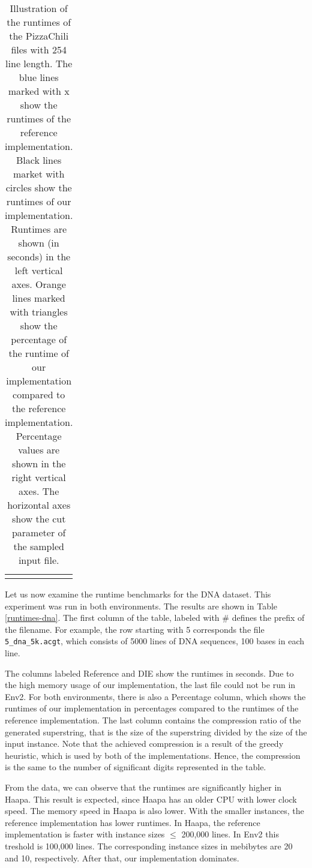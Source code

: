 \documentclass[english,twoside,censored,csm,algorithms-track-2020]{HYthesisML}
\theoremstyle{plain}
\theoremstyle{definition}
\numberwithin{testexample}{chapter}
\begin{document}
\begin{table}[]
{\begin{tabular}{c@{\hskip 0.5in}c}
\hspace{0.6cm}
\begin{minipage}{.5\textwidth}
  \caption{Illustration of the runtimes of the PizzaChili files with 254 line length. The blue lines
    marked with x show the runtimes of the reference implementation. Black lines market with circles
    show the runtimes of our implementation. Runtimes are shown (in seconds) in the left vertical
    axes. Orange lines marked with triangles show the percentage of the runtime of our implementation
    compared to the reference implementation. Percentage values are shown in the right vertical axes.
    The horizontal axes show the cut parameter of the sampled input file.}
  \label{tbl-graphs}    
\end{minipage}

  \end{tabular}%
}
\end{table}



\vspace{-2.5cm}
Let us now examine the runtime benchmarks for the DNA dataset. This experiment was run in both
environments. The results are shown in Table \ref{runtimes-dna}. The first column of the table,
labeled with \# defines the prefix of the filename. For example, the row starting with 5 corresponds the
file \texttt{5\_dna\_5k.acgt}, which consists of 5000 lines of DNA sequences, 100 bases in each
line.
  
The columns labeled Reference and DIE show the runtimes in seconds.
Due to the high memory usage of our implementation, the last file could not be run in Env2.
For both environments, there is
also a Percentage column, which shows the runtimes of our implementation in percentages compared
to the runtimes of the reference implementation. The last column contains the compression ratio of the
generated superstring, that is the size of the superstring divided by the size of the input instance.
Note that the achieved compression is a result of the greedy heuristic, which is used by both
of the implementations. Hence, the compression is the same to the number of significant digits
represented in the table.

From the data, we can observe that the runtimes are significantly higher in Haapa. This result is
expected, since Haapa has an older CPU with lower clock speed. The memory speed in Haapa is
also lower. With the smaller instances, the reference implementation has lower runtimes.
In Haapa, the reference implementation is faster with instance sizes $\leq$ 200,000 lines.
In Env2 this treshold is 100,000 lines. The corresponding instance sizes in mebibytes are
20 and 10, respectively. After that, our implementation dominates.
\end{document}
